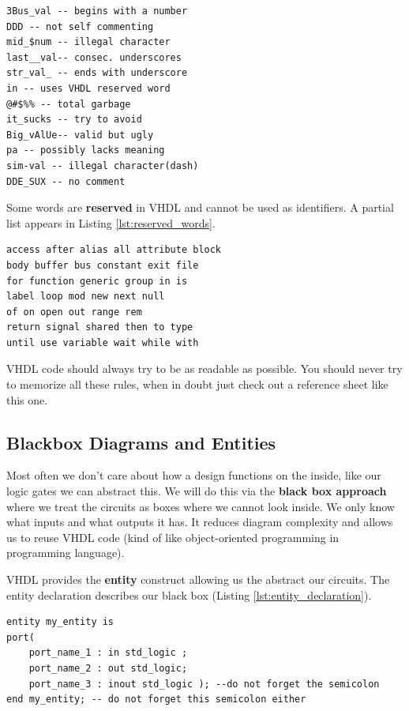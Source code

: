 \documentclass[a4paper,10pt]{IEEEtran}
\begin{document}
\begin{lstlisting}[caption={Invalid identifiers \cite{free-range-vhdl}.}, label={lst:invalid_identifiers}]
3Bus_val -- begins with a number
DDD -- not self commenting
mid_$num -- illegal character
last__val-- consec. underscores
str_val_ -- ends with underscore
in -- uses VHDL reserved word
@#$%% -- total garbage
it_sucks -- try to avoid
Big_vAlUe-- valid but ugly
pa -- possibly lacks meaning
sim-val -- illegal character(dash)
DDE_SUX -- no comment
\end{lstlisting}

Some words are \textbf{reserved} in VHDL and cannot be used as identifiers. A partial list appears in Listing \ref{lst:reserved_words}.

\begin{lstlisting}[caption={Reserved Words \cite{free-range-vhdl}.}, label={lst:reserved_words}]
access after alias all attribute block
body buffer bus constant exit file
for function generic group in is
label loop mod new next null
of on open out range rem
return signal shared then to type
until use variable wait while with
\end{lstlisting}

VHDL code should always try to be as readable as possible. You should never try to memorize all these rules, when in doubt just check out a reference sheet like this one.

\subsection{Blackbox Diagrams and Entities}
Most often we don't care about how a design functions on the inside, like our logic gates we can abstract this. We will do this via the \textbf{black box approach} where we treat the circuits as boxes where we cannot look inside. We only know what inputs and what outputs it has. It reduces diagram complexity and allows us to reuse VHDL code (kind of like object-oriented programming in programming language).

VHDL provides the \textbf{entity} construct allowing us the abstract our circuits. The entity declaration describes our black box (Listing \ref{lst:entity_declaration}).

\begin{lstlisting}[caption={The entity declaration in VHDL \cite{free-range-vhdl}.}, label={lst:entity_declaration}]
entity my_entity is
port(
    port_name_1 : in std_logic ;
    port_name_2 : out std_logic;
    port_name_3 : inout std_logic ); --do not forget the semicolon
end my_entity; -- do not forget this semicolon either
\end{lstlisting}
\end{document}
